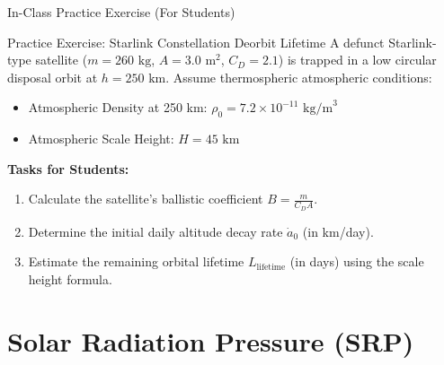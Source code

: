 \documentclass[aspectratio=169,11pt]{beamer}
\begin{document}
\begin{frame}{In-Class Practice Exercise (For Students)}
    \begin{block}{Practice Exercise: Starlink Constellation Deorbit Lifetime}
        A defunct Starlink-type satellite ($m = 260\text{ kg}$, $A = 3.0\text{ m}^2$, $C_D = 2.1$) is trapped in a low circular disposal orbit at $h = 250\text{ km}$.
        Assume thermospheric atmospheric conditions:
        \begin{itemize}
            \item Atmospheric Density at 250 km: $\rho_0 = 7.2 \times 10^{-11}\text{ kg/m}^3$
            \item Atmospheric Scale Height: $H = 45\text{ km}$
        \end{itemize}

        \textbf{Tasks for Students:}
        \begin{enumerate}
            \item Calculate the satellite's ballistic coefficient $B = \frac{m}{C_D A}$.
            \item Determine the initial daily altitude decay rate $\dot{a}_0$ (in km/day).
            \item Estimate the remaining orbital lifetime $L_{\text{lifetime}}$ (in days) using the scale height formula.
        \end{enumerate}
    \end{block}
\end{frame}

\section{Solar Radiation Pressure (SRP)}
\end{document}
